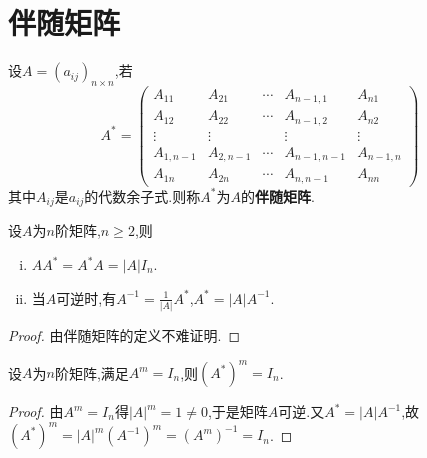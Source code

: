 \documentclass[../../main.tex]{subfiles}%
\begin{document}
\section{伴随矩阵}

\begin{definition}[伴随矩阵定义]\label{definition:伴随矩阵定义}
设$A=(a_{ij})_{n\times n}$,若
\[
A^* = 
\begin{pmatrix}
A_{11} & A_{21} & \cdots & A_{n - 1,1} & A_{n1} \\
A_{12} & A_{22} & \cdots & A_{n - 1,2} & A_{n2} \\
\vdots & \vdots & & \vdots & \vdots \\
A_{1,n - 1} & A_{2,n - 1} & \cdots & A_{n - 1,n - 1} & A_{n - 1,n} \\
A_{1n} & A_{2n} & \cdots & A_{n,n - 1} & A_{nn}
\end{pmatrix}
\]
其中\(A_{ij}\)是\(a_{ij}\)的代数余子式.则称\(A^*\)为\(A\)的\textbf{伴随矩阵}.
\end{definition}

\begin{theorem}\label{theorem:伴随矩阵的基本性质}
设$A$为$n$阶矩阵,$n\geqslant  2$,则
\begin{enumerate}[(i)]
\item $AA^*=A^*A=\left| A \right|I_n$.
\item\label{伴随矩阵基本性质2} 当$A$可逆时,有$A^{-1}=\frac{1}{\left| A \right|}A^*$,$A^*=|A|A^{-1}$.
\end{enumerate}
\end{theorem}
\begin{proof}

由伴随矩阵的定义不难证明.

\end{proof}

\begin{proposition}
设\(A\)为\(n\)阶矩阵,满足\(A^m = I_n\),则\((A^*)^m = I_n\).
\end{proposition}
\begin{proof}

由\(A^m = I_n\)得\(|A|^m = 1\ne 0\),于是矩阵$A$可逆.又\(A^* = |A|A^{-1}\),故$(A^*)^m = |A|^m(A^{-1})^m = (A^m)^{-1} = I_n$.

\end{proof}
\end{document}
